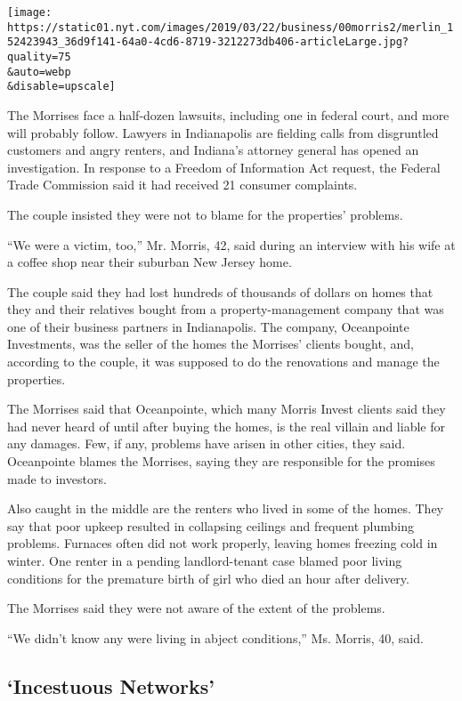 \texttt{[image: https://static01.nyt.com/images/2019/03/22/business/00morris2/merlin\_152423943\_36d9f141-64a0-4cd6-8719-3212273db406-articleLarge.jpg?quality=75\\\&auto=webp\\\&disable=upscale]}

The Morrises face a half-dozen lawsuits, including one in federal court,
and more will probably follow. Lawyers in Indianapolis are fielding
calls from disgruntled customers and angry renters, and Indiana's
attorney general has opened an investigation. In response to a Freedom
of Information Act request, the Federal Trade Commission said it had
received 21 consumer complaints.

The couple insisted they were not to blame for the properties' problems.

``We were a victim, too,'' Mr. Morris, 42, said during an interview with
his wife at a coffee shop near their suburban New Jersey home.

The couple said they had lost hundreds of thousands of dollars on homes
that they and their relatives bought from a property-management company
that was one of their business partners in Indianapolis. The company,
Oceanpointe Investments, was the seller of the homes the Morrises'
clients bought, and, according to the couple, it was supposed to do the
renovations and manage the properties.

The Morrises said that Oceanpointe, which many Morris Invest clients
said they had never heard of until after buying the homes, is the real
villain and liable for any damages. Few, if any, problems have arisen in
other cities, they said. Oceanpointe blames the Morrises, saying they
are responsible for the promises made to investors.

Also caught in the middle are the renters who lived in some of the
homes. They say that poor upkeep resulted in collapsing ceilings and
frequent plumbing problems. Furnaces often did not work properly,
leaving homes freezing cold in winter. One renter in a pending
landlord-tenant case blamed poor living conditions for the premature
birth of girl who died an hour after delivery.

The Morrises said they were not aware of the extent of the problems.

``We didn't know any were living in abject conditions,'' Ms. Morris, 40,
said.

\hypertarget{incestuous-networks}{%
\subsection{`Incestuous Networks'}\label{incestuous-networks}}

